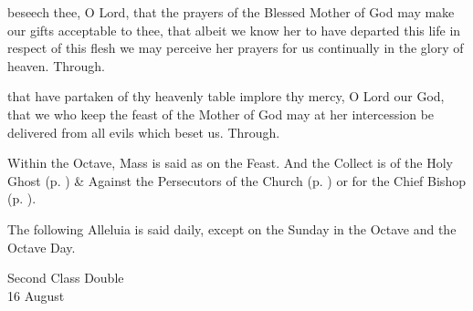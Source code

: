 \secret
{} beseech thee, O Lord, that the prayers of the Blessed Mother of God may make our gifts acceptable to thee, that albeit we know her to have departed this life in respect of this flesh we may perceive her prayers for us continually in the glory of heaven. Through.


\postcommunion
{} that have partaken of thy heavenly table implore thy mercy, O Lord our God, that we who keep the feast of the Mother of God may at her intercession be delivered from all evils which beset us. Through.

\begin{rubric}
    Within the Octave, Mass is said as on the Feast. And the  Collect is of the Holy Ghost (p. \pageref{SPHolyGhost}) \&  Against the Persecutors of the Church (p. \pageref{SPAgainst}) or for the Chief Bishop (p. \pageref{SPChiefBishop}).
\end{rubric}
\begin{rubric}
    The following Alleluia is said daily, except on the Sunday in the Octave and the Octave Day.
\end{rubric}

\begin{inhead}
    {Second Class Double\\
16 August}
\end{inhead}
\par\noindent
{}


